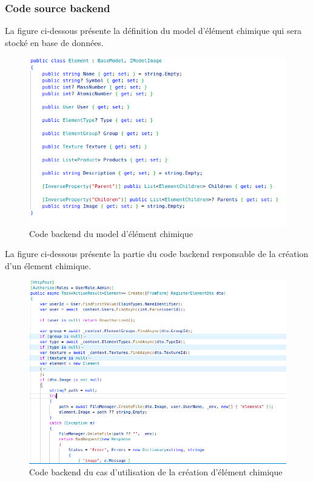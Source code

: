 \subsubsection{Code source backend}

La figure ci-dessous présente la définition du model d'élément chimique qui sera stocké en base de données.

\begin{figure}[H]
	\centering
	\includegraphics[width=1\textwidth]{img/met}
	\caption{Code backend du model d'élément chimique}
	\label{fig:mesh1}
\end{figure}

La figure ci-dessous présente la partie du code backend responsable de la création d'un élement chimique.
\begin{figure}[H]
	\centering
	\includegraphics[width=1\textwidth]{img/cep}
	\caption{Code backend du cas d'utilisation de la création d'élément chimique}
	\label{fig:mesh1}
\end{figure}

